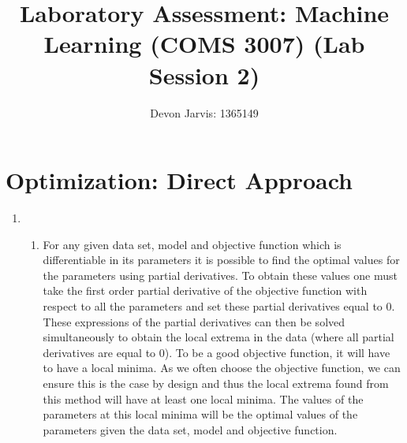 \documentclass{article}
\title{Laboratory Assessment: Machine Learning (COMS 3007) (Lab Session 2)}
\author{Devon Jarvis: 1365149}
\begin{document}
	\maketitle
	\section{Optimization: Direct Approach}
	\begin{enumerate}
		\item
		\begin{enumerate}[label=\arabic*)]
			\item For any given data set, model and objective function which is differentiable in its parameters it is possible	to find the optimal values for the parameters using partial derivatives. To obtain these values one must take the first order partial derivative of the objective function with respect to all the parameters and set these partial derivatives equal to 0. These expressions of the partial derivatives can then be solved simultaneously to obtain the local extrema in the data (where all partial derivatives are equal to 0). To be a good objective function, it will have to have a local minima. As we often choose	the objective function, we can ensure this is the case by design and thus the local extrema found from this method will have at least one local minima. The values of the parameters at this local minima will be the optimal values of the parameters given the data set, model and objective function. \\
			

\end{enumerate}
\end{enumerate}
\end{document}
